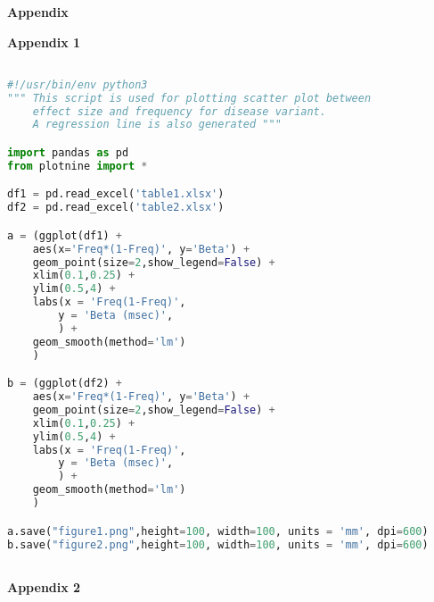 \cleardoublepage\clearpage


\Large \vspace{1cm}
{\bf Appendix} 


\large \vspace{1cm}
{\bf Appendix 1} 
\small 

\begin{lstlisting}[language=Python, breaklines]

#!/usr/bin/env python3
""" This script is used for plotting scatter plot between
    effect size and frequency for disease variant. 
    A regression line is also generated """

import pandas as pd
from plotnine import *

df1 = pd.read_excel('table1.xlsx')
df2 = pd.read_excel('table2.xlsx')

a = (ggplot(df1) +
    aes(x='Freq*(1-Freq)', y='Beta') + 
    geom_point(size=2,show_legend=False) +
    xlim(0.1,0.25) +
    ylim(0.5,4) +
    labs(x = 'Freq(1-Freq)',
        y = 'Beta (msec)',
        ) +
    geom_smooth(method='lm')
    )

b = (ggplot(df2) +
    aes(x='Freq*(1-Freq)', y='Beta') + 
    geom_point(size=2,show_legend=False) +
    xlim(0.1,0.25) +
    ylim(0.5,4) +
    labs(x = 'Freq(1-Freq)',
        y = 'Beta (msec)',
        ) +
    geom_smooth(method='lm')
    )

a.save("figure1.png",height=100, width=100, units = 'mm', dpi=600)
b.save("figure2.png",height=100, width=100, units = 'mm', dpi=600)



\end{lstlisting}

\cleardoublepage\clearpage
\large \vspace{1cm}
{\bf Appendix 2} 
\small 

